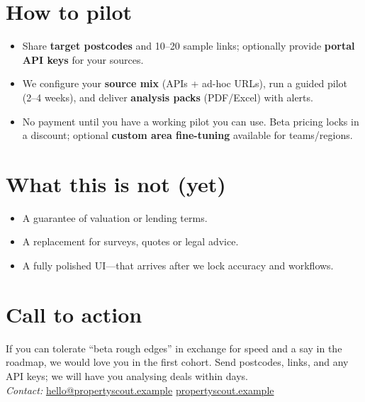 \documentclass[11pt,a4paper]{article}
\begin{document}
\section*{How to pilot}
\begin{itemize}
  \item Share \textbf{target postcodes} and 10--20 sample links; optionally provide \textbf{portal API keys} for your sources.
  \item We configure your \textbf{source mix} (APIs + ad-hoc URLs), run a guided pilot (2--4 weeks), and deliver \textbf{analysis packs} (PDF/Excel) with alerts.
  \item No payment until you have a working pilot you can use. Beta pricing locks in a discount; optional \textbf{custom area fine-tuning} available for teams/regions.
\end{itemize}

\section*{What this is not (yet)}
\begin{itemize}
  \item A guarantee of valuation or lending terms.
  \item A replacement for surveys, quotes or legal advice.
  \item A fully polished UI---that arrives after we lock accuracy and workflows.
\end{itemize}

\section*{Call to action}
If you can tolerate ``beta rough edges'' in exchange for speed and a say in the roadmap, we would love you in the first cohort. Send postcodes, links, and any API keys; we will have you analysing deals within days.\\[0.25em]
\textit{Contact:} \href{mailto:hello@propertyscout.example}{hello@propertyscout.example} \quad\textbar\quad \href{https://propertyscout.example}{propertyscout.example}
\end{document}
